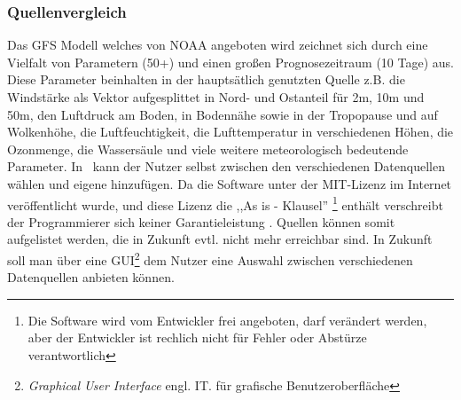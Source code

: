 \subsubsection{Quellenvergleich} %
Das GFS \cite{gfs} Modell welches von NOAA angeboten wird zeichnet
sich durch eine Vielfalt von Parametern (50+) und einen großen Prognosezeitraum (10 Tage) aus.
Diese Parameter beinhalten in der hauptsätlich genutzten Quelle \cite{bspgfs} z.B.
die Windstärke als Vektor aufgesplittet in Nord- und Ostanteil für 2m, 10m und 50m,
den Luftdruck am Boden, in Bodennähe sowie in der Tropopause und auf Wolkenhöhe,
die Luftfeuchtigkeit, die Lufttemperatur in verschiedenen Höhen, die Ozonmenge, die Wassersäule
und viele weitere meteorologisch bedeutende Parameter.
In \vs\ kann der Nutzer selbst zwischen den verschiedenen Datenquellen wählen und eigene hinzufügen.
Da die Software unter der MIT-Lizenz \cite{mitl} im Internet veröffentlicht wurde,
und diese Lizenz die ,,As is - Klausel''
\footnote{Die Software wird vom Entwickler frei angeboten, darf verändert werden,
aber der Entwickler ist rechlich nicht für Fehler oder Abstürze verantwortlich} enthält verschreibt
der Programmierer sich keiner Garantieleistung \cite{mitl}. Quellen können somit
aufgelistet werden, die in Zukunft evtl. nicht mehr erreichbar sind.
In Zukunft soll man über eine GUI\footnote{\textit{Graphical User Interface} engl. IT.
für grafische Benutzeroberfläche} dem Nutzer eine Auswahl
zwischen verschiedenen Datenquellen anbieten können.


